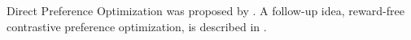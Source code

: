 \documentclass[11pt]{article}
\begin{document}
Direct Preference Optimization was proposed by \cite{rafailov2023dpo}.
A follow-up idea, reward-free contrastive preference optimization, is
described in \cite{this_key_does_not_exist_2099}.



\end{document}

